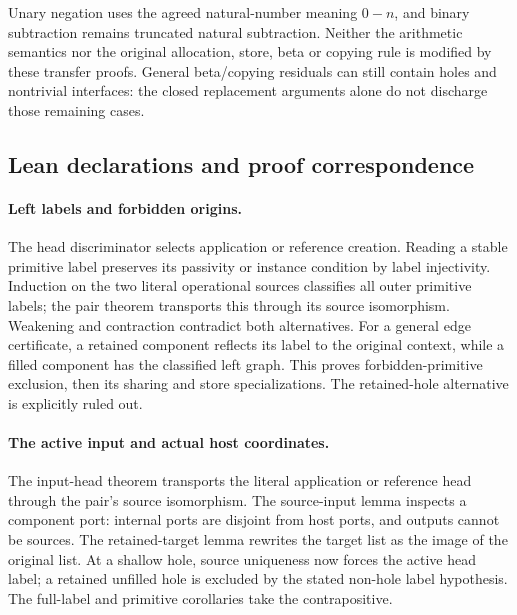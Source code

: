 Unary negation uses the agreed natural-number meaning $0-n$, and binary
subtraction remains truncated natural subtraction. Neither the arithmetic
semantics nor the original allocation, store, beta or copying rule is
modified by these transfer proofs. General beta/copying residuals can still
contain holes and nontrivial interfaces: the closed replacement arguments
alone do not discharge those remaining cases.

\subsection{Lean declarations and proof correspondence}

\paragraph{Left labels and forbidden origins.}
The head discriminator selects application or reference creation. Reading a
stable primitive label preserves its passivity or instance condition by label
injectivity. Induction on the two literal operational sources classifies all
outer primitive labels; the pair theorem transports this through its source
isomorphism. Weakening and contraction contradict both alternatives.
For a general edge certificate, a retained component reflects its label to
the original context, while a filled component has the classified left graph.
This proves forbidden-primitive exclusion, then its sharing and store
specializations. The retained-hole alternative is explicitly ruled out.

\par{}

\paragraph{The active input and actual host coordinates.}
The input-head theorem transports the literal application or reference head
through the pair's source isomorphism. The source-input lemma inspects a
component port: internal ports are disjoint from host ports, and outputs cannot
be sources. The retained-target lemma rewrites the target list as the image of
the original list. At a shallow hole, source uniqueness now forces the active
head label; a retained unfilled hole is excluded by the stated non-hole label
hypothesis. The full-label and primitive corollaries take the contrapositive.

